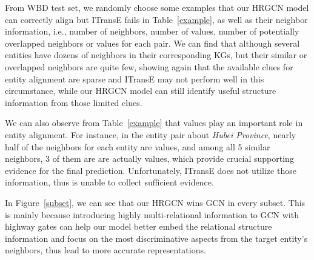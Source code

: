 	From WBD test set, we randomly choose some examples that our HRGCN model can correctly align but ITransE fails in Table~\ref{example}, as well as their neighbor information, i.e., number of neighbors, number of values, number of potentially overlapped neighbors or values for each pair.
	We can find that although several entities have dozens of neighbors in their corresponding KGs, but their similar or overlapped neighbors are quite few, showing again that
	the available clues for entity alignment are sparse and ITransE may not perform well in this circumstance, while our HRGCN model can still identify useful structure information from those limited clues.
	
	We can also observe from Table~\ref{example} that values play an important role in entity alignment.
	For instance, in the entity pair about \textit{Hubei Province}, nearly half of the neighbors for each entity are values, and among all 5 similar neighbors, 3 of them are are actually values,
	which provide crucial supporting evidence for the final prediction. Unfortunately, ITransE does not utilize those information, thus is unable to collect sufficient evidence.

	
	In Figure~\ref{subset}, we can see that our HRGCN wins GCN in every subset.
	This is mainly because introducing highly multi-relational information to GCN with highway gates can help our model better embed the relational structure information and focus on the most discriminative aspects from the target entity's neighbors, thus lead to more accurate representations.
		
	

